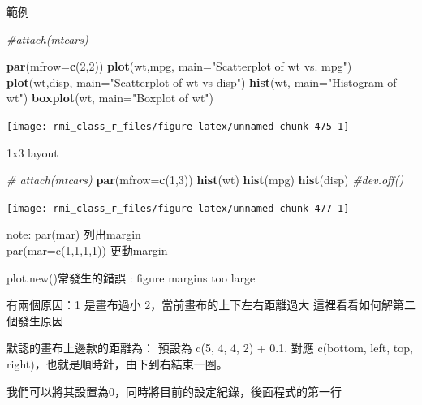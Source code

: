 \documentclass[]{book}
\newenvironment{Shaded}{\begin{snugshade}}{\end{snugshade}}
\newcommand{\CommentTok}[1]{\textcolor[rgb]{0.56,0.35,0.01}{\textit{#1}}}
\newcommand{\DataTypeTok}[1]{\textcolor[rgb]{0.13,0.29,0.53}{#1}}
\newcommand{\DecValTok}[1]{\textcolor[rgb]{0.00,0.00,0.81}{#1}}
\newcommand{\KeywordTok}[1]{\textcolor[rgb]{0.13,0.29,0.53}{\textbf{#1}}}
\newcommand{\NormalTok}[1]{#1}
\newcommand{\StringTok}[1]{\textcolor[rgb]{0.31,0.60,0.02}{#1}}
\theoremstyle{definition}
\theoremstyle{definition}
\theoremstyle{definition}
\theoremstyle{remark}
\begin{document}
範例

\begin{Shaded}
\begin{Highlighting}[]
\CommentTok{#attach(mtcars)}

\KeywordTok{par}\NormalTok{(}\DataTypeTok{mfrow=}\KeywordTok{c}\NormalTok{(}\DecValTok{2}\NormalTok{,}\DecValTok{2}\NormalTok{))}
\KeywordTok{plot}\NormalTok{(wt,mpg, }\DataTypeTok{main=}\StringTok{"Scatterplot of wt vs. mpg"}\NormalTok{)}
\KeywordTok{plot}\NormalTok{(wt,disp, }\DataTypeTok{main=}\StringTok{"Scatterplot of wt vs disp"}\NormalTok{)}
\KeywordTok{hist}\NormalTok{(wt, }\DataTypeTok{main=}\StringTok{"Histogram of wt"}\NormalTok{)}
\KeywordTok{boxplot}\NormalTok{(wt, }\DataTypeTok{main=}\StringTok{"Boxplot of wt"}\NormalTok{)}
\end{Highlighting}
\end{Shaded}

\begin{center}\texttt{[image: rmi\_class\_r\_files/figure-latex/unnamed-chunk-475-1]} \end{center}

1x3 layout

\begin{Shaded}
\begin{Highlighting}[]
\CommentTok{# attach(mtcars)}
\KeywordTok{par}\NormalTok{(}\DataTypeTok{mfrow=}\KeywordTok{c}\NormalTok{(}\DecValTok{1}\NormalTok{,}\DecValTok{3}\NormalTok{)) }
\KeywordTok{hist}\NormalTok{(wt)}
\KeywordTok{hist}\NormalTok{(mpg)}
\KeywordTok{hist}\NormalTok{(disp)}
\CommentTok{#dev.off()}
\end{Highlighting}
\end{Shaded}

\begin{center}\texttt{[image: rmi\_class\_r\_files/figure-latex/unnamed-chunk-477-1]} \end{center}

note: par(mar) 列出margin\\
par(mar=c(1,1,1,1)) 更動margin

plot.new()常發生的錯誤 : figure margins too large

有兩個原因：1 是畫布過小 2，當前畫布的上下左右距離過大
這裡看看如何解第二個發生原因

默認的畫布上邊款的距離為： 預設為 c(5, 4, 4, 2) + 0.1. 對應 c(bottom,
left, top, right)，也就是順時針，由下到右結束一圈。

我們可以將其設置為0，同時將目前的設定紀錄，後面程式的第一行
\end{document}
